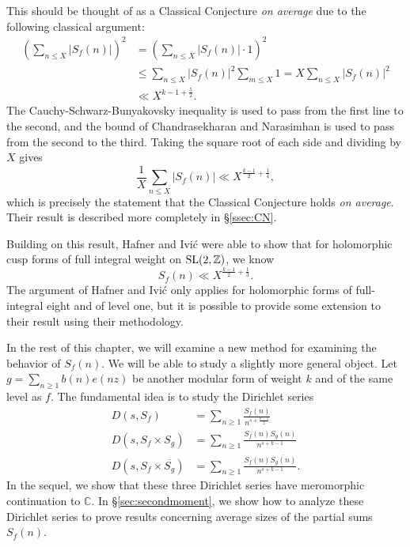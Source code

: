 This should be thought of as a Classical Conjecture \emph{on average} due to the following
classical argument:
\begin{align}
  \left( \sum_{n \leq X} \lvert S_f(n) \rvert \right)^2 &= \left( \sum_{n \leq X} \lvert
  S_f(n) \rvert \cdot 1 \right)^2
  \\
  &\leq \sum_{n \leq X} \lvert S_f(n) \rvert^2 \sum_{m \leq X} 1 = X \sum_{n \leq X}
  \lvert S_f(n) \rvert^2
  \\
  &\ll X^{k-1 + \frac{5}{2}}.
\end{align}
The Cauchy-Schwarz-Bunyakovsky inequality is used to pass from the first line to the
second, and the bound of Chandrasekharan and Narasimhan is used to pass from the second to
the third.
Taking the square root of each side and dividing by $X$ gives
\begin{equation}
  \frac{1}{X} \sum_{n \leq X} \lvert S_f(n) \rvert \ll X^{\frac{k-1}{2} + \frac{1}{4}},
\end{equation}
which is precisely the statement that the Classical Conjecture holds \emph{on average}.
Their result is described more completely in \S\ref{ssec:CN}.



Building on this result, Hafner and Ivi\'c were able to show that for holomorphic cusp
forms of full integral weight on $\operatorname{SL}(2, \mathbb{Z})$, we know
\begin{equation}
  S_f(n) \ll X^{\frac{k-1}{2} + \frac{1}{3}}.
\end{equation}
The argument of Hafner and Ivi\'c only applies for holomorphic forms of full-integral
eight and of level one, but it is possible to provide some extension to their result using
their methodology.


In the rest of this chapter, we will examine a new method for examining the behavior of $S_f(n)$.
We will be able to study a slightly more general object.
Let $g = \sum_{n \geq 1} b(n) e(nz)$ be another modular form of weight $k$ and of the same
level as $f$.
The fundamental idea is to study the Dirichlet series
\begin{align}
  D(s, S_f) &= \sum_{n \geq 1} \frac{S_f(n)}{n^{s + \frac{k-1}{2}}} \\
  D(s, S_f \times S_g) &= \sum_{n \geq 1} \frac{S_f(n) S_g(n)}{n^{s + k-1}} \\
  D(s, S_f \times \overline{S_g}) &= \sum_{n \geq 1}
  \frac{S_f(n) \overline{S_g(n)}}{n^{s + k-1}}.
\end{align}
In the sequel, we show that these three Dirichlet series have meromorphic continuation to
$\mathbb{C}$.
In \S\ref{sec:secondmoment}, we show how to analyze these Dirichlet series
to prove results concerning average sizes of the partial sums $S_f(n)$.


